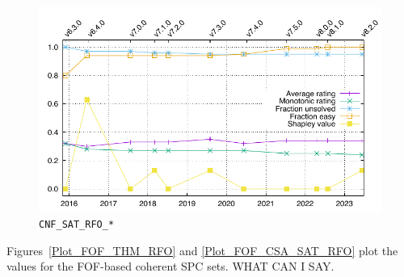 \documentclass[runningheads]{llncs}
\begin{document}
\begin{figure}[h!]
\begin{minipage}[t]{.49\textwidth}
  \centering
  \includegraphics[width=\textwidth]{Plots/GNUPlots/CNF_SAT_RFO.pdf}
  \vspace*{-2em}
  \caption{{\tt CNF\_SAT\_RFO\_*}}
  \label{Plot_CNF_SAT}
\end{minipage}
\end{figure}

Figures~\ref{Plot_FOF_THM_RFO} and \ref{Plot_FOF_CSA_SAT_RFO} plot the values for the FOF-based 
coherent SPC sets.
WHAT CAN I SAY.
\end{document}
